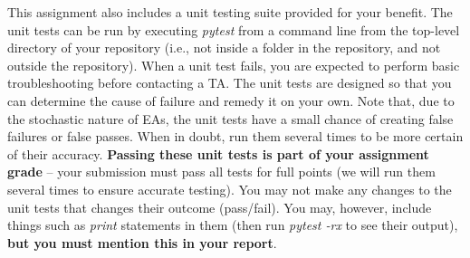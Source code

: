 \documentclass{article}
\begin{document}
This assignment also includes a unit testing suite provided for your benefit. The unit tests can be run by executing \emph{pytest} from a command line from the top-level directory of your repository (i.e., not inside a folder in the repository, and not outside the repository). When a unit test fails, you are expected to perform basic troubleshooting before contacting a TA. The unit tests are designed so that you can determine the cause of failure and remedy it on your own. Note that, due to the stochastic nature of EAs, the unit tests have a small chance of creating false failures or false passes. When in doubt, run them several times to be more certain of their accuracy. \textbf{Passing these unit tests is part of your assignment grade} -- your submission must pass all tests for full points (we will run them several times to ensure accurate testing). You may not make any changes to the unit tests that changes their outcome (pass/fail). You may, however, include things such as \emph{print} statements in them (then run \emph{pytest -rx} to see their output), \textbf{but you must mention this in your report}.
\end{document}
